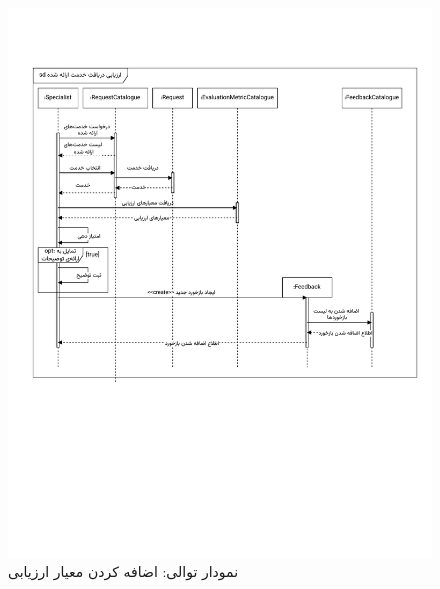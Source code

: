 \begin{figure}[ht!]
	\centering
	\includegraphics[scale=0.8, page=3]{figs/OOD-Sequence-3.pdf}
	\caption{نمودار توالی: اضافه کردن معیار ارزیابی}
\end{figure}
\FloatBarrier
\newpage

